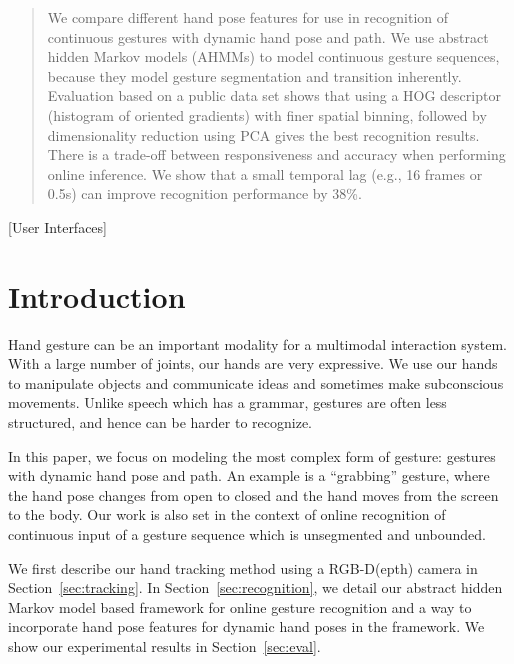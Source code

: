 \documentclass{acm_proc_article-sp}
\begin{document}
\maketitle
\begin{abstract}
We compare different hand pose features for use in recognition of continuous gestures
with dynamic hand pose and path. We use abstract hidden Markov models (AHMMs) to
model continuous gesture sequences, because they model 
gesture segmentation and transition inherently. Evaluation based on a public data set
shows that using a HOG descriptor (histogram of oriented gradients) with finer spatial binning, followed by dimensionality
reduction using PCA gives the best recognition results. There is a trade-off between
responsiveness and accuracy when performing online inference. We show that a small temporal lag (e.g., 16 frames or 0.5s)
 can improve recognition performance by 38\%.
\end{abstract}

[User Interfaces]


\section{Introduction}
Hand gesture can be an important modality for a multimodal interaction system.
With a large number of joints, our hands are very expressive. We use our hands to
manipulate objects and communicate ideas and sometimes make subconscious movements. Unlike speech which
has a grammar, gestures are often less structured, and hence can be harder to recognize.

In this paper, we focus on modeling the most complex form of gesture: gestures with 
dynamic hand pose and path. An example is a ``grabbing'' gesture, where
the hand pose changes from open to closed and the hand moves from the screen to the body.
Our work is also set in the context of online recognition of continuous input of a gesture sequence which is unsegmented and unbounded.

We first describe our hand tracking method using a RGB-D(epth) camera in Section~\ref{sec:tracking}. 
In Section~\ref{sec:recognition}, we detail 
our abstract hidden Markov model based framework for online gesture recognition and a way to
incorporate hand pose features for dynamic hand poses in the framework. We show our experimental results in Section~\ref{sec:eval}.
\end{document}
